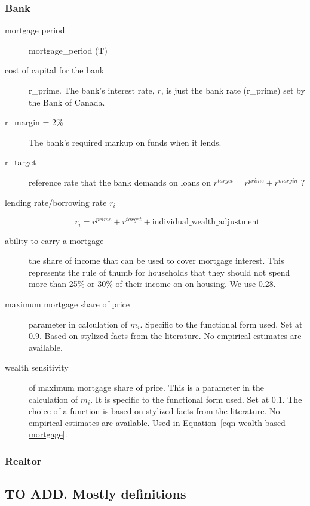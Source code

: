 \subsubsection{Bank} %
\begin{description}
\item [mortgage period]  mortgage\_period (T)
\item [cost of capital for the bank] r\_prime. The bank's interest rate, $r$, is just the bank rate (r\_prime) set by the Bank of Canada.  

\item [r\_margin = 2\%] The bank's required markup on funds when it lends.  
\item [r\_target] reference rate that the bank demands on loans on 
$ r^{target}= r^{prime} +r^{margin}$ ? 

\item[lending rate/borrowing rate $r_i$]  
\[r_i=r^{prime} + r^{target} + \mathrm{individual\_wealth\_adjustment}\]

\label{fig-capital-cost}

\item [{ability to carry a mortgage}] the share of income that can be used to cover mortgage interest. This represents the rule of thumb for households that they should not spend more than 25\% or 30\% of their income on on housing. We use 0.28.

\item [\gls{maximum mortgage share} of price] parameter in calculation of $m_i$. Specific to the functional form used. Set at 0.9. Based on stylized facts from the literature.  No empirical estimates are available.
\item[wealth sensitivity] of maximum mortgage share of price. This is a parameter in the calculation of $m_i$. It is specific to the functional form used. Set at 0.1. The choice of a function is based on stylized facts from the literature.  No empirical estimates are available. Used in Equation~\ref{eqn-wealth-based-mortgage}.
\end{description}

\subsubsection{Realtor}


\subsection{TO ADD. Mostly definitions}
